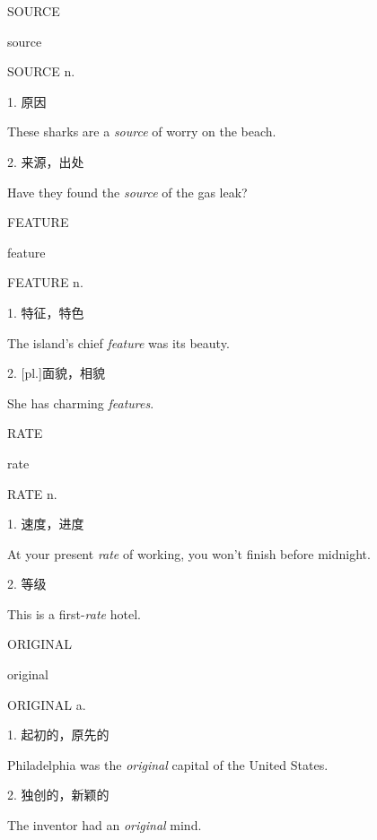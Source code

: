 \begin{flashcard}{
SOURCE

source
}
\begin{center}
SOURCE n. 
\end{center}
1. 原因

These sharks are a \textit{source} of worry on the beach.

2. 来源，出处

Have they found the \textit{source} of the gas leak?

\end{flashcard}
\begin{flashcard}{
FEATURE

feature
}
\begin{center}
FEATURE n. 
\end{center}
1. 特征，特色

The island's chief \textit{feature} was its beauty.

2. [pl.]面貌，相貌

She has charming \textit{features}.

\end{flashcard}
\begin{flashcard}{
RATE

rate
}
\begin{center}
RATE n. \textipa{[reit]}
\end{center}
1. 速度，进度

At your present \textit{rate} of working, you won't finish before midnight.

2. 等级

This is a first-\textit{rate} hotel.

\end{flashcard}
\begin{flashcard}{
ORIGINAL

original
}
\begin{center}
ORIGINAL a. 
\end{center}
1. 起初的，原先的

Philadelphia was the \textit{original} capital of the United States.

2. 独创的，新颖的

The inventor had an \textit{original} mind.

\end{flashcard}
